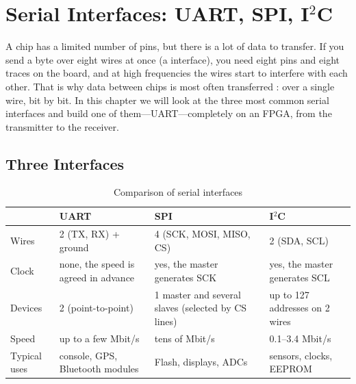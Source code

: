 \chapter{Serial Interfaces: UART, SPI, I$^2$C}
\label{ch:uart}

A chip has a limited number of pins, but there is a lot of data to transfer. If
you send a byte over eight wires at once (a  interface), you
need eight pins and eight traces on the board, and at high frequencies the
wires start to interfere with each other. That is why data between chips is
most often transferred : over a single wire, bit by bit. In
this chapter we will look at the three most common serial interfaces and build
one of them---UART---completely on an FPGA, from the transmitter to the
receiver.

\section{Three Interfaces}

\begin{table}[H]
\centering
\caption{Comparison of serial interfaces}
\small
\begin{tabularx}{\textwidth}{l X X X}
\toprule
 & \textbf{UART} & \textbf{SPI} & \textbf{I$^2$C} \\
\midrule
Wires & 2 (TX, RX) + ground & 4 (SCK, MOSI, MISO, CS) & 2 (SDA, SCL) \\
Clock & none, the speed is agreed in advance & yes, the master generates SCK & yes, the master generates SCL \\
Devices & 2 (point-to-point) & 1 master and several slaves (selected by CS lines) & up to 127 addresses on 2 wires \\
Speed & up to a few Mbit/s & tens of Mbit/s & 0.1--3.4 Mbit/s \\
Typical uses & console, GPS, Bluetooth modules & Flash, displays, ADCs & sensors, clocks, EEPROM \\
\bottomrule
\end{tabularx}
\end{table}

